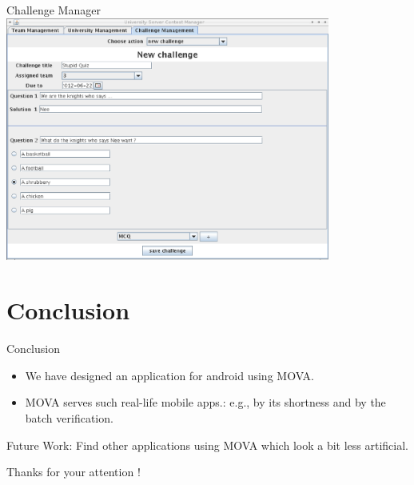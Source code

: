 \documentclass{beamer}
\newlength{\wideitemsep}
\let\olditem\item
\renewcommand{\item}{\setlength{\itemsep}{\wideitemsep}\olditem}
\begin{document}
\begin{frame}{Challenge Manager}
    \includegraphics[width =0.8\textwidth]{../screenshots/challenge_manager}
\end{frame}

\section{Conclusion}
\begin{frame}{Conclusion}
    \begin{itemize}
        \item We have designed an application for android using MOVA.
        \item MOVA serves such real-life mobile apps.: e.g., by its shortness  and by the batch verification. 
    \end{itemize}
    \vspace{1cm}
    \pause Future Work: Find other applications using MOVA which look a bit less artificial.
\end{frame}

\begin{frame}
     \begin{center}
         \Huge{Thanks for your attention !}
     \end{center}
\end{frame}
\end{document}
